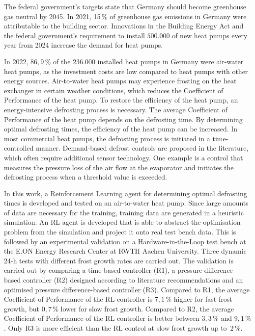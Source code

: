 The federal government's targets state that Germany should become greenhouse gas neutral by 2045. In 2021, 15\,\% of greenhouse gas emissions in Germany were attributable to the building sector. Innovations in the Building Energy Act and the federal government's requirement to install $500.000$ of new heat pumps every year from 2024 increase the demand for heat pumps.

In 2022, $86,9\,\%$ of the $236.000$ installed heat pumps in Germany were air-water heat pumps, as the investment costs are low compared to heat pumps with other energy sources. Air-to-water heat pumps may experience frosting on the heat exchanger in certain weather conditions, which reduces the Coefficient of Performance of the heat pump. To restore the efficiency of the heat pump, an energy-intensive defrosting process is necessary. The average Coefficient of Performance of the heat pump depends on the defrosting time. By determining optimal defrosting times, the efficiency of the heat pump can be increased. In most commercial heat pumps, the defrosting process is initiated in a time-controlled manner. Demand-based defrost controls are proposed in the literature, which often require additional sensor technology. One example is a control that measures the pressure loss of the air flow at the evaporator and initiates the defrosting process when a threshold value is exceeded.

In this work, a Reinforcement Learning agent for determining optimal defrosting times is developed and tested on an air-to-water heat pump. Since large amounts of data are necessary for the training, training data are generated in a heuristic simulation. An RL agent is developed that is able to abstract the optimisation problem from the simulation and project it onto real test bench data. This is followed by an experimental validation on a Hardware-in-the-Loop test bench at the E.ON Energy Research Center at RWTH Aachen University. Three dynamic 24-h tests with different frost growth rates are carried out. The validation is carried out by comparing a time-based controller (R1), a pressure difference-based controller (R2) designed according to literature recommendations and an optimised pressure difference-based controller (R3). Compared to R1, the average Coefficient of Performance of the RL controller is $7,1\,\%$ higher for fast frost growth, but $0,7\,\%$ lower for slow frost growth. Compared to R2, the average Coefficient of Performance of the RL controller is better between $3,3\,\%$ and $9,1\,\%$. Only R3 is more efficient than the RL control at slow frost growth up to~$2\,\%$.
